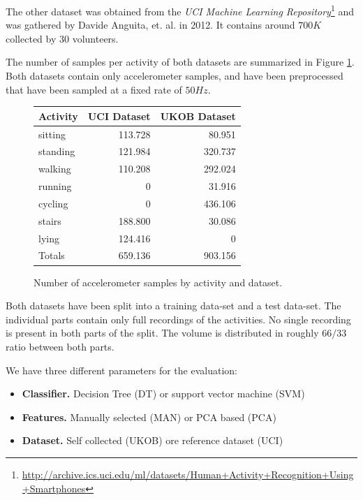 The other dataset was obtained from the {\it UCI Machine Learning
  Repository}\footnote{\url{http://archive.ics.uci.edu/ml/datasets/Human+Activity+Recognition+Using+Smartphones}}
and was gathered by Davide Anguita, et. al. \cite{Anguita} in 2012.
It contains around $700K$ collected by 30 volunteers.

The number of samples per activity of both datasets are summarized in
Figure \ref{fig:har_datasets}. Both datasets contain only
accelerometer samples, and have been preprocessed that have been
sampled at a fixed rate of $50Hz$.

\begin{figure}[h]
\centering
\begin{tabular}{|l|r|r|} \hline
Activity  & UCI Dataset & UKOB Dataset \\ \hline
sitting   & 113.728     & 80.951        \\
standing  & 121.984     & 320.737       \\
walking   & 110.208     & 292.024       \\
running   & 0           & 31.916        \\
cycling   & 0           & 436.106       \\
stairs    & 188.800     & 30.086        \\
lying     & 124.416     & 0            \\ \hline \hline
Totals    & 659.136     & 903.156       \\ \hline
\end{tabular}
\caption{Number of accelerometer samples by activity and dataset.}
\label{fig:har_datasets}
\end{figure}

Both datasets have been split into a training data-set and a test
data-set. The individual parts contain only full recordings of the
activities. No single recording is present in both parts of the
split. The volume is distributed in roughly $66/33$ ratio between
both parts.

We have three different parameters for the evaluation:
\begin{itemize}
\item {\bf Classifier.} Decision Tree (DT) or support vector machine (SVM)
\item {\bf Features.} Manually selected (MAN) or PCA based (PCA)
\item {\bf Dataset.} Self collected (UKOB) ore reference dataset (UCI)
\end{itemize}

